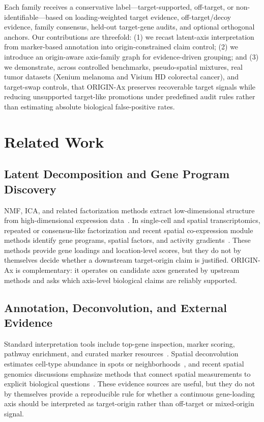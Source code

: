 \documentclass[conference]{IEEEtran}
\begin{document}
Each family receives a conservative label---target-supported, off-target, or non-identifiable---based on loading-weighted target evidence, off-target/decoy evidence, family consensus, held-out target-gene audits, and optional orthogonal anchors. Our contributions are threefold: (1) we recast latent-axis interpretation from marker-based annotation into origin-constrained claim control; (2) we introduce an origin-aware axis-family graph for evidence-driven grouping; and (3) we demonstrate, across controlled benchmarks, pseudo-spatial mixtures, real tumor datasets (Xenium melanoma and Visium HD colorectal cancer), and target-swap controls, that ORIGIN-Ax preserves recoverable target signals while reducing unsupported target-like promotions under predefined audit rules rather than estimating absolute biological false-positive rates.

\section{Related Work}

\subsection{Latent Decomposition and Gene Program Discovery}

NMF, ICA, and related factorization methods extract low-dimensional structure
from high-dimensional expression data~\cite{lee1999learning,hyvarinen2000ica}.
In single-cell and spatial transcriptomics, repeated or consensus-like
factorization and recent spatial co-expression module methods identify gene
programs, spatial factors, and activity gradients~\cite{kotliar2019cnmf,higgins2025stihc}.
These methods provide gene loadings and location-level scores, but they do not
by themselves decide whether a downstream target-origin claim is justified.
ORIGIN-Ax is complementary: it operates on candidate axes generated by upstream
methods and asks which axis-level biological claims are reliably supported.

\subsection{Annotation, Deconvolution, and External Evidence}

Standard interpretation tools include top-gene inspection, marker scoring,
pathway enrichment, and curated marker resources~\cite{subramanian2005gsea,zhang2019cellmarker}.
Spatial deconvolution estimates cell-type abundance in spots or
neighborhoods~\cite{kleshchevnikov2022cell2location,cable2022rctd}, and recent
spatial genomics discussions emphasize methods that connect spatial
measurements to explicit biological questions~\cite{jena2024openquestions}.
These evidence sources are useful, but they do not by themselves provide a
reproducible rule for whether a continuous gene-loading axis should be
interpreted as target-origin rather than off-target or mixed-origin signal.
\end{document}
